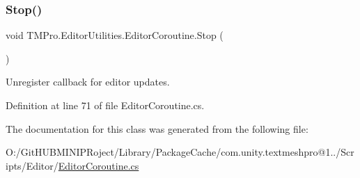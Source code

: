 \subsubsection{\texorpdfstring{Stop()}{Stop()}}
{\footnotesize\ttfamily void T\+M\+Pro.\+Editor\+Utilities.\+Editor\+Coroutine.\+Stop (\begin{DoxyParamCaption}{ }\end{DoxyParamCaption})}



Unregister callback for editor updates. 



Definition at line 71 of file Editor\+Coroutine.\+cs.



The documentation for this class was generated from the following file\+:\begin{DoxyCompactItemize}
\item 
O\+:/\+Git\+H\+U\+B\+M\+I\+N\+I\+P\+Roject/\+Library/\+Package\+Cache/com.\+unity.\+textmeshpro@1../\+Scripts/\+Editor/\mbox{\hyperlink{_editor_coroutine_8cs}{Editor\+Coroutine.\+cs}}\end{DoxyCompactItemize}
